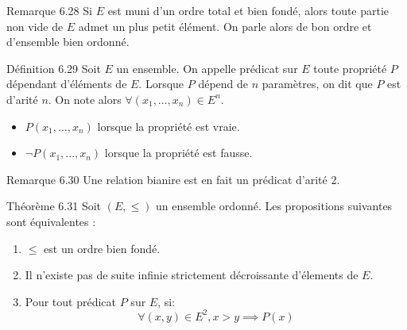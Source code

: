 \documentclass{article}
\begin{document}
\begin{adjustwidth}{-3cm}{-3cm}
    Remarque 6.28
    Si $E$ est muni d'un ordre total et bien fondé, alors toute partie non vide de $E$ admet un plus petit élément. On parle alors de bon ordre et d'ensemble bien ordonné.

    Définition 6.29
    Soit $E$ un ensemble. On appelle prédicat sur $E$ toute propriété $P$ dépendant d'éléments de $E$.
    Lorsque $P$ dépend de $n$ paramètres, on dit que $P$ est d'arité $n$. On note alors $\forall (x_1, \ldots, x_n) \in E^n$. \begin{itemize}
        \item $P(x_1,...,x_n)$ lorsque la propriété est vraie.
        \item $\lnot P(x_1,...,x_n)$ lorsque la propriété est fausse.
    \end{itemize}

    Remarque 6.30
    Une relation bianire est en fait un prédicat d'arité 2.

    Théorème 6.31
    Soit $(E,\leq)$ un ensemble ordonné. Les propositions suivantes sont équivalentes : \begin{enumerate}
        \item $\leq$ est un ordre bien fondé.
        \item Il n'existe pas de suite infinie strictement décroissante d'élements de $E$.
        \item Pour tout prédicat $P$ sur $E$, si: $$\forall (x,y) \in E^2, x > y \implies P(x)$$
    \end{enumerate}



\end{adjustwidth}
\end{document}

